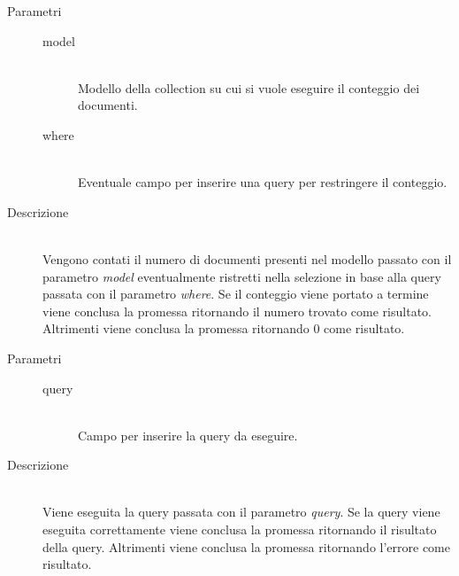 \begin{description}
\begin{mldescription}
		 \hfill 
			\begin{description}
				\item[Parametri] \hfill
					\begin{description}
						\item[model] \hfill \\
							Modello della collection su cui si vuole eseguire il conteggio dei documenti.
						\item[where] \hfill \\
							Eventuale campo per inserire una query per restringere il conteggio.
					\end{description}
				\item[Descrizione] \hfill \\
Vengono contati il numero di documenti presenti nel modello passato con il parametro \textit{model} eventualmente ristretti nella selezione in base alla query passata con il parametro \textit{where}. Se il conteggio viene portato a termine viene conclusa la promessa ritornando il numero trovato come risultato. Altrimenti viene conclusa la promessa ritornando 0 come risultato.
				
			\end{description}
	
			 \hfill 
				\begin{description}
					\item[Parametri] \hfill
						\begin{description}
							\item[query] \hfill \\
								Campo per inserire la query da eseguire.
						\end{description}
					\item[Descrizione] \hfill \\
	Viene eseguita la query passata con il parametro \textit{query}. Se la query viene eseguita correttamente viene conclusa la promessa ritornando il risultato della query. Altrimenti viene conclusa la promessa ritornando l'errore come risultato.
					
				\end{description}
				

\end{mldescription}
\end{description}
